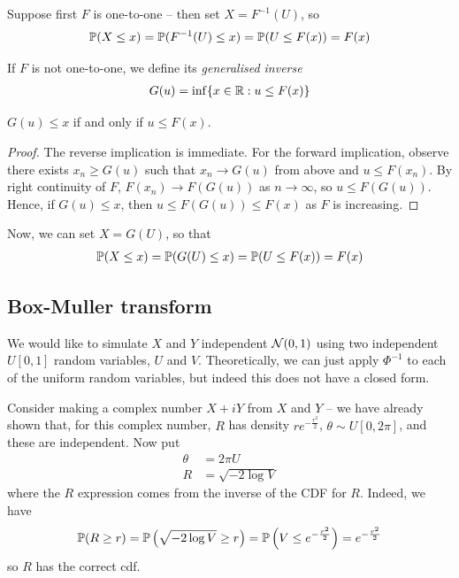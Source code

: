 \documentclass{../../template/note}
\begin{document}
    Suppose first \(F\) is one-to-one -- then set \(X = F^{-1}(U)\), so
    \begin{align*}
        \mathbb P(X \leq x) = \mathbb P(F^{-1}(U) \leq x) = \mathbb P(U \leq F(x)) = F(x)
    \end{align*}
    
    If \(F\) is not one-to-one, we define its \emph{generalised inverse}
    \begin{align*}
        G(u) = \inf\{x \in \mathbb R: u \leq F(x)\}
    \end{align*}
    
    \begin{lemma}
        \(G(u) \leq x\) if and only if \(u \leq F(x)\).
    \end{lemma}
    
    \begin{proof}
        The reverse implication is immediate. For the forward implication, observe there exists \(x_n \geq G(u)\) such that \(x_n \to G(u)\) from above and \(u \leq F(x_n)\). By right continuity of \(F\), \(F(x_n) \to F(G(u))\) as \(n \to \infty\), so \(u \leq F(G(u))\). Hence, if \(G(u) \leq x\), then \(u \leq F(G(u)) \leq F(x)\) as \(F\) is increasing.
    \end{proof}
    
    Now, we can set \(X = G(U)\), so that
    \begin{align*}
        \mathbb P(X \leq x) = \mathbb P(G(U) \leq x) = \mathbb P(U \leq F(x)) = F(x)
    \end{align*}

    \subsection{Box-Muller transform}

    We would like to simulate \(X\) and \(Y\) independent \(\mathcal{N}(0, 1)\) using two independent \(U[0, 1]\) random variables, \(U\) and \(V\). Theoretically, we can just apply \(\Phi^{-1}\) to each of the uniform random variables, but indeed this does not have a closed form.

    Consider making a complex number \(X+iY\) from \(X\) and \(Y\) -- we have already shown that, for this complex number, \(R\) has density \(re^{-\frac{r^2}{2}}\), \(\theta \sim U[0, 2\pi]\), and these are independent. Now put
    \begin{align*}
        \theta &= 2\pi U \\
        R &= \sqrt{-2 \log V}
    \end{align*}
    where the \(R\) expression comes from the inverse of the CDF for \(R\). Indeed, we have
    \begin{align*}
        \mathbb P(R \geq r) = \mathbb P\left(\sqrt{-2\log V} \geq r\right) = \mathbb P\left(V \leq e^{-\frac{r^2}2}\right) = e^{-\frac{r^2}{2}}
    \end{align*}
    so \(R\) has the correct cdf.
\end{document}
